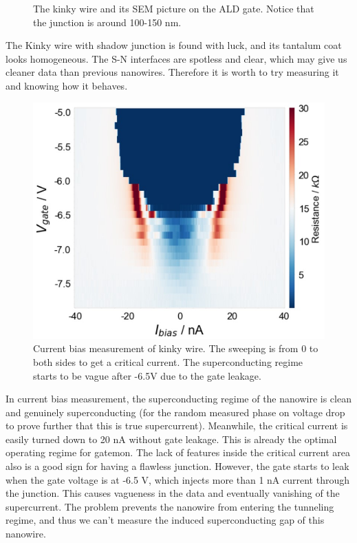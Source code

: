 \begin{figure}[h!]
\begin{subfigure}[b]{0.47\textwidth}
         \caption{}
         \label{}
     \end{subfigure}
     \caption{The kinky wire and its SEM picture on the ALD gate. Notice that the junction is around 100-150 nm.}
    \label{KinkywireSEM}
\end{figure}

The Kinky wire with shadow junction is found with luck, and its tantalum coat looks homogeneous. The S-N interfaces are spotless and clear, which may give us cleaner data than previous nanowires. Therefore it is worth to try measuring it and knowing how it behaves.

\begin{figure}[h!]
    \centering
    \includegraphics [width=0.7\linewidth]{Pic/DC2_NW7_Ibias_R.jpg}
    \caption{Current bias measurement of kinky wire. The sweeping is from 0 to both sides to get a critical current. The superconducting regime starts to be vague after -6.5V due to the gate leakage.}
    \label{IbiasKink}
\end{figure}

In current bias measurement, the superconducting regime of the nanowire is clean and genuinely superconducting (for the random measured phase on voltage drop to prove further that this is true supercurrent). Meanwhile, the critical current is easily turned down to 20 nA without gate leakage. This is already the optimal operating regime for gatemon. The lack of features inside the critical current area also is a good sign for having a flawless junction. However, the gate starts to leak when the gate voltage is at -6.5 V, which injects more than 1 nA current through the junction. This causes vagueness in the data and eventually vanishing of the supercurrent. The problem prevents the nanowire from entering the tunneling regime, and thus we can't measure the induced superconducting gap of this nanowire.

